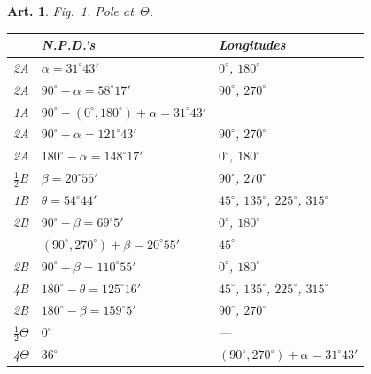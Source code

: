 \documentclass[11pt,a4paper]{article}
\theoremstyle{plain}
\newtheorem{art}{Art.}[section]
\begin{document}
\begin{art}
Fig.~1. Pole at~$\Theta$.

\begin{center}
\begin{tabular}{|l|l|l|}
\hline
& N.P.D.'s & Longitudes \\
\hline
2A & $\alpha = 31^\circ 43'$ & $0^\circ$, $180^\circ$ \\
2A & $90^\circ - \alpha = 58^\circ 17'$ & $90^\circ$, $270^\circ$ \\
1A & $90^\circ - (0^\circ, 180^\circ) + \alpha = 31^\circ 43'$ & \\
2A & $90^\circ + \alpha = 121^\circ 43'$ & $90^\circ$, $270^\circ$ \\
2A & $180^\circ - \alpha = 148^\circ 17'$ & $0^\circ$, $180^\circ$ \\
\hline
$\frac{1}{2}$B & $\beta = 20^\circ 55'$ & $90^\circ$, $270^\circ$ \\
1B & $\theta = 54^\circ 44'$ & $45^\circ$, $135^\circ$, $225^\circ$, $315^\circ$ \\
2B & $90^\circ - \beta = 69^\circ 5'$ & $0^\circ$, $180^\circ$ \\
& $(90^\circ, 270^\circ) + \beta = 20^\circ 55'$ & $45^\circ$ \\
2B & $90^\circ + \beta = 110^\circ 55'$ & $0^\circ$, $180^\circ$ \\
4B & $180^\circ - \theta = 125^\circ 16'$ & $45^\circ$, $135^\circ$, $225^\circ$, $315^\circ$ \\
2B & $180^\circ - \beta = 159^\circ 5'$ & $90^\circ$, $270^\circ$ \\
\hline
$\frac{1}{2}\Theta$ & $0^\circ$ & --- \\
4$\Theta$ & $36^\circ$ & $(90^\circ, 270^\circ) + \alpha = 31^\circ 43'$ \\
\hline
\end{tabular}
\end{center}
\end{art}
\end{document}
